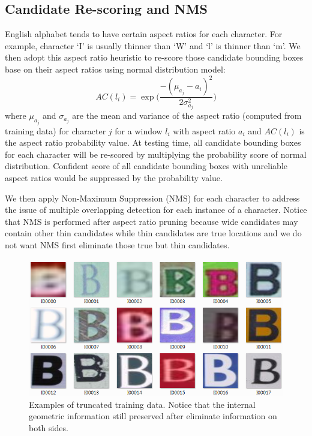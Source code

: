 \documentclass[10pt,twocolumn,letterpaper]{article}
\begin{document}
\subsection{Candidate Re-scoring and NMS}

English alphabet tends to have certain aspect ratios for each character. For example, character `I' is usually thinner than `W' and `l' is thinner than `m'. We then adopt this aspect ratio heuristic to re-score those candidate bounding boxes base on their aspect ratios using normal distribution model:
\[
AC(l_i) = \exp \Bigg( \frac{-(\mu_{a_j} - a_i)^2}{2\sigma_{a_j}^2} \Bigg)
\]
where $\mu_{a_j}$ and $\sigma_{a_j}$ are the mean and variance of the aspect ratio (computed from training data) for character $j$ for a window $l_i$ with aspect ratio $a_i$ and $AC(l_i)$ is the aspect ratio probability value. At testing time, all candidate bounding boxes for each character will be re-scored by multiplying the probability score of normal distribution. Confident score of all candidate bounding boxes with unreliable aspect ratios would be suppressed by the probability value.

We then apply Non-Maximum Suppression (NMS) for each character to address the issue of multiple overlapping detection for each instance of a character. Notice that NMS is performed after aspect ratio pruning because wide candidates may contain other thin candidates while thin candidates are true locations and we do not want NMS first eliminate those true but thin candidates.

\begin{figure}[t]
\begin{center}
\includegraphics[width=1\linewidth]{fig/train_data}
\end{center}
   \caption{Examples of truncated training data. Notice that the internal geometric information still preserved after eliminate information on both sides.}
\label{fig:sample1}
\end{figure}
\end{document}
